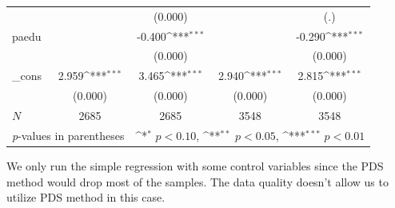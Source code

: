 \documentclass[]{AEA}
\def\sym#1{\ifmmode^{#1}\else\(^{#1}\)\fi}
\begin{document}
\begin{center}
\begin{table}
\begin{tabular}{l*{4}c}
                    &                     &     (0.000)         &                     &         (.)         \\
        [1em]
        paedu       &                     &      -0.400\sym{***}&                     &      -0.290\sym{***}\\
                    &                     &     (0.000)         &                     &     (0.000)         \\
        [1em]
        \_cons      &       2.959\sym{***}&       3.465\sym{***}&       2.940\sym{***}&       2.815\sym{***}\\
                    &     (0.000)         &     (0.000)         &     (0.000)         &     (0.000)         \\
        \hline
        \(N\)       &        2685         &        2685         &        3548         &        3548         \\
        \hline\hline
        \multicolumn{2}{l}{\footnotesize \textit{p}-values in parentheses} & \multicolumn{3}{r}{\footnotesize \sym{*} \(p<0.10\), \sym{**} \(p<0.05\), \sym{***} \(p<0.01\)}\\
        \end{tabular}
        \begin{tablenotes}
            We only run the simple regression with some control variables since the PDS method would drop most of the samples. The data quality doesn't allow us to utilize PDS method in this case.
        \end{tablenotes}
        \end{table}
        \end{center}
    
   








\appendix





\end{document}
